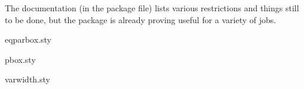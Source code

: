 The documentation (in the package file) lists various restrictions and
things still to be done, but the package is already proving useful for
a variety of jobs.
\begin{ctanrefs}
\item[eqparbox.sty]
\item[pbox.sty]
\item[varwidth.sty]
\end{ctanrefs}

